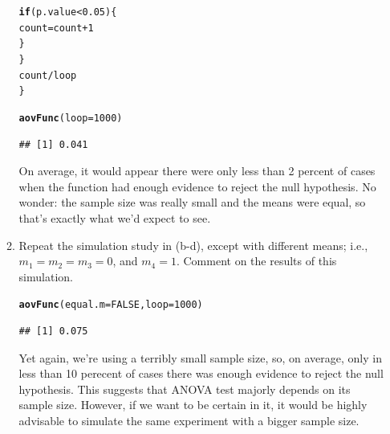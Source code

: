 \documentclass{article}\usepackage[]{graphicx}\usepackage[]{color}
\makeatletter
\newcommand{\hlnum}[1]{\textcolor[rgb]{0.686,0.059,0.569}{#1}}%
\newcommand{\hlopt}[1]{\textcolor[rgb]{0,0,0}{#1}}%
\newcommand{\hlstd}[1]{\textcolor[rgb]{0.345,0.345,0.345}{#1}}%
\newcommand{\hlkwa}[1]{\textcolor[rgb]{0.161,0.373,0.58}{\textbf{#1}}}%
\newcommand{\hlkwb}[1]{\textcolor[rgb]{0.69,0.353,0.396}{#1}}%
\newcommand{\hlkwc}[1]{\textcolor[rgb]{0.333,0.667,0.333}{#1}}%
\newcommand{\hlkwd}[1]{\textcolor[rgb]{0.737,0.353,0.396}{\textbf{#1}}}%
\newenvironment{kframe}{%
 \def\at@end@of@kframe{}%
 \ifinner\ifhmode%
  \def\at@end@of@kframe{\end{minipage}}%
  \begin{minipage}{\columnwidth}%
 \fi\fi%
 \def\FrameCommand##1{\hskip\@totalleftmargin \hskip-\fboxsep
 \colorbox{shadecolor}{##1}\hskip-\fboxsep
     \hskip-\linewidth \hskip-\@totalleftmargin \hskip\columnwidth}%
 \MakeFramed {\advance\hsize-\width
   \@totalleftmargin\z@ \linewidth\hsize
   \@setminipage}}%
 {\par\unskip\endMakeFramed%
 \at@end@of@kframe}
\newenvironment{knitrout}{}{} %
\makeatother
\begin{document}
\begin{enumerate}
\begin{enumerate}
\begin{knitrout}
\begin{kframe}
\begin{alltt}
    \hlkwa{if}\hlstd{(p.value}\hlopt{<}\hlnum{0.05}\hlstd{)\{}
     \hlstd{count}\hlkwb{=}\hlstd{count}\hlopt{+}\hlnum{1}
    \hlstd{\}}
  \hlstd{\}}
  \hlstd{count}\hlopt{/}\hlstd{loop}
\hlstd{\}}
\end{alltt}
\end{kframe}
\end{knitrout}


\begin{knitrout}
\color{fgcolor}\begin{kframe}
\begin{alltt}
\hlkwd{aovFunc}\hlstd{(}\hlkwc{loop}\hlstd{=}\hlnum{1000}\hlstd{)}
\end{alltt}
\begin{verbatim}
## [1] 0.041
\end{verbatim}
\end{kframe}
\end{knitrout}
On average, it would appear there were only less than 2 percent of cases when the function had enough evidence to reject the null hypothesis. No wonder: the sample size was really small and the means were equal, so that's exactly what we'd expect to see.


  \item Repeat the simulation study in (b-d), except with different means; i.e.,
  $m_1=m_2=m_3=0$, and $m_4=1$. Comment on the results of this simulation.

\begin{knitrout}
\color{fgcolor}\begin{kframe}
\begin{alltt}
\hlkwd{aovFunc}\hlstd{(}\hlkwc{equal.m}\hlstd{=}\hlnum{FALSE}\hlstd{,} \hlkwc{loop}\hlstd{=}\hlnum{1000}\hlstd{)}
\end{alltt}
\begin{verbatim}
## [1] 0.075
\end{verbatim}
\end{kframe}
\end{knitrout}
Yet again, we're using a terribly small sample size, so, on average, only in less than 10 perecent of cases there was enough evidence to reject the null hypothesis. This suggests that ANOVA test majorly depends on its sample size. However, if we want to be certain in it, it would be highly advisable to simulate the same experiment with a bigger sample size.



\end{enumerate}
\end{enumerate}
\end{document}
